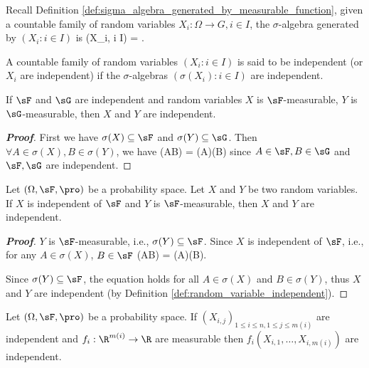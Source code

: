 \begin{definition}\label{def:sigma_algebra_generated_by_random_variable}
Recall Definition \ref{def:sigma_algebra_generated_by_measurable_function}, given a countable family of random variables $X_i : \Omega \to G, i \in I$, the $\sigma$-algebra generated by $(X_i : i \in I)$ is
\be
\sigma(X_i, i \in I) = \sigma{}.
\ee
\end{definition}

\begin{definition}\label{def:random_variable_independent}
A countable family of random variables $(X_i : i \in I)$ is said to be independent (or $X_i$ are independent) if the $\sigma$-algebras $(\sigma(X_i) : i \in I)$ are independent.
\end{definition}

\begin{proposition}\label{pro:independent_sigma_algebra_random_variable}
If $\sF$ and $\sG$ are independent and random variables $X$ is $\sF$-measurable, $Y$ is $\sG$-measurable, then $X$ and $Y$ are independent.
\end{proposition}

\begin{proof}[\bf Proof]
First we have $\sigma(X) \subseteq \sF$ and $\sigma (Y)\subseteq \sG$. Then $\forall A\in \sigma(X),B\in \sigma(Y)$, we have
\be
\pro(A\cap B) = \pro(A)\pro(B)
\ee
since $A\in \sF,B\in \sG$ and $\sF,\sG$ are independent.
\end{proof}

\begin{proposition}\label{pro:independent_and_measurable}
Let $(\Omega,\sF,\pro)$ be a probability space. Let $X$ and $Y$ be two random variables. If $X$ is independent of $\sF$ and $Y$ is $\sF$-measurable, then $X$ and $Y$ are independent.
\end{proposition}

\begin{proof}[\bf Proof]
$Y$ is $\sF$-measurable, i.e., $\sigma(Y) \subseteq \sF$. Since $X$ is independent of $\sF$, i.e., for any $A\in \sigma(X)$, $B\in \sF$
\be
\pro(A\cap B) = \pro(A)\pro(B).
\ee

Since $\sigma(Y) \subseteq \sF$, the equation holds for all $A\in \sigma(X)$ and $B\in \sigma(Y)$, thus $X$ and $Y$ are independent (by Definition \ref{def:random_variable_independent}).
\end{proof}

\begin{theorem}\label{thm:random_variable_function_indenpence}
Let $(\Omega,\sF,\pro)$ be a probability space. If $(X_{i,j})_{1 \leq i \leq n,1 \leq j \leq m(i)}$ are independent and $f_i : \R^{m(i)} \to \R$ are measurable then $f_i(X_{i,1},\dots,X_{i,m(i)})$ are independent.
\end{theorem}

